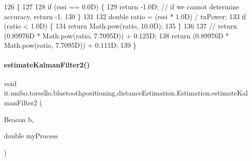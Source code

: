 \begin{DoxyCode}
126                                                                   \{
127 
128         \textcolor{keywordflow}{if} (rssi == 0.0D) \{
129             \textcolor{keywordflow}{return} -1.0D; \textcolor{comment}{// if we cannot determine accuracy, return -1.}
130         \}
131 
132         \textcolor{keywordtype}{double} ratio = (rssi * 1.0D) / txPower;
133         \textcolor{keywordflow}{if} (ratio < 1.0D) \{
134             \textcolor{keywordflow}{return} Math.pow(ratio, 10.0D);
135         \}
136 
137 \textcolor{comment}{//        return (0.89976D * Math.pow(ratio, 7.7095D)) + 0.125D;}
138         \textcolor{keywordflow}{return} (0.89976D * Math.pow(ratio, 7.7095D)) + 0.111D;
139     \}
\end{DoxyCode}
\hypertarget{classit_1_1unibo_1_1torsello_1_1bluetoothpositioning_1_1distanceEstimation_1_1Estimation_aae2873bb4c4a99faba630468d6ef20e0_aae2873bb4c4a99faba630468d6ef20e0}{}\label{classit_1_1unibo_1_1torsello_1_1bluetoothpositioning_1_1distanceEstimation_1_1Estimation_aae2873bb4c4a99faba630468d6ef20e0_aae2873bb4c4a99faba630468d6ef20e0} 
\paragraph{\texorpdfstring{estimate\+Kalman\+Filter2()}{estimateKalmanFilter2()}}
{\footnotesize\ttfamily void it.\+unibo.\+torsello.\+bluetoothpositioning.\+distance\+Estimation.\+Estimation.\+estimate\+Kalman\+Filter2 (\begin{DoxyParamCaption}\item[{Beacon}]{b,  }\item[{double}]{my\+Process }\end{DoxyParamCaption})\hspace{0.3cm}{\ttfamily [private]}}


